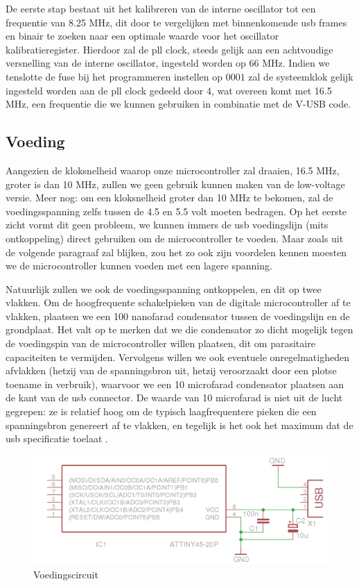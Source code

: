 De eerste stap bestaat uit het kalibreren van de interne oscillator tot een frequentie van 8.25 MHz, dit door te vergelijken met binnenkomende \ac{usb} frames en binair te zoeken naar een optimale waarde voor het  oscillator kalibratieregister. Hierdoor zal de \ac{pll} clock, steeds gelijk aan een achtvoudige versnelling van de interne oscillator, ingesteld worden op 66 MHz. Indien we tenslotte de  fuse bij het programmeren instellen op $0001$ zal de systeemklok gelijk ingesteld worden aan de \ac{pll} clock gedeeld door 4, wat overeen komt met 16.5 MHz, een frequentie die we kunnen gebruiken in combinatie met de V-USB code.

\subsection{Voeding}

Aangezien de kloksnelheid waarop onze microcontroller zal draaien, 16.5 MHz, groter is dan 10 MHz, zullen we geen gebruik kunnen maken van de low-voltage versie. Meer nog: om een kloksnelheid groter dan 10 MHz te bekomen, zal de voedingsspanning zelfs tussen de 4.5 en 5.5 volt moeten bedragen. Op het eerste zicht vormt dit geen probleem, we kunnen immers de \ac{usb} voedingslijn (mits ontkoppeling) direct gebruiken om de microcontroller te voeden. Maar zoals uit de volgende paragraaf zal blijken, zou het zo ook zijn voordelen kennen moesten we de microcontroller kunnen voeden met een lagere spanning.

Natuurlijk zullen we ook de voedingsspanning ontkoppelen, en dit op twee vlakken. Om de hoogfrequente schakelpieken van de digitale microcontroller af te vlakken, plaatsen we een 100 nanofarad condensator tussen de voedingslijn en de grondplaat. Het valt op te merken dat we die condensator zo dicht mogelijk tegen de voedingspin van de microcontroller willen plaatsen, dit om parasitaire capaciteiten te vermijden. Vervolgens willen we ook eventuele onregelmatigheden afvlakken (hetzij van de spanningsbron uit, hetzij veroorzaakt door een plotse toename in verbruik), waarvoor we een 10 microfarad condensator plaatsen aan de kant van de \ac{usb} connector. De waarde van 10 microfarad is niet uit de lucht gegrepen: ze is relatief hoog om de typisch laagfrequentere pieken die een spanningsbron genereert af te vlakken, en tegelijk is het ook het maximum dat de \ac{usb} specificatie toelaat \citep{usbnutshell}.

\begin{figure}
	\includegraphics[width=\textwidth]{afbeeldingen/inputmodule_voeding}
	\caption{Voedingscircuit}
\end{figure}

